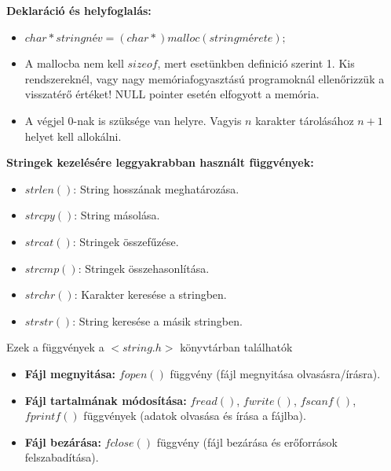 \documentclass[11pt,a4paper]{article}
\begin{document}
            \begin{tcolorbox}[colback=blue!5!white,colframe=blue!50!black,title= 62. Ismertesse a string tárolás C nyelvű megvalósítást{,} valamint a stringek kezelésére leggyakrabban használt függvényeket!]
            \textbf{Deklaráció és helyfoglalás:}    
                \begin{itemize}
                    \item \(char*stringnév = (char*)malloc(string mérete);\)
                    \item A mallocba nem kell \(sizeof\), mert esetünkben definició szerint 1. Kis rendszereknél, vagy nagy memóriafogyasztású programoknál ellenőrizzük a visszatérő értéket! NULL pointer esetén elfogyott a memória.
                    \item A végjel 0-nak is szüksége van helyre. Vagyis \(n\) karakter tárolásához \(n+1\) helyet kell allokálni.
                \end{itemize}
            \textbf{Stringek kezelésére leggyakrabban használt függvények:}
            \begin{itemize}
                \item \(strlen()\): String hosszának meghatározása.
                \item \(strcpy()\): String másolása.
                \item \(strcat()\): Stringek összefűzése.
                \item \(strcmp()\): Stringek összehasonlítása.
                \item \(strchr()\): Karakter keresése a stringben.
                \item \(strstr()\): String keresése a másik stringben.
            \end{itemize}
            Ezek a függvények a \(<string.h>\) könyvtárban találhatók
            \end{tcolorbox}
            
            \begin{tcolorbox}[colback=blue!5!white,colframe=blue!50!black,title= 63. Ismertesse a szöveges fájlok módosításának lépéseit!]
                \begin{itemize}
                    \item \textbf{Fájl megnyitása:} \(fopen()\) függvény (fájl megnyitása olvasásra/írásra).
                    \item \textbf{Fájl tartalmának módosítása:} \(fread()\), \(fwrite()\), \(fscanf()\), \(fprintf()\) függvények (adatok olvasása és írása a fájlba).
                    \item \textbf{Fájl bezárása:} \(fclose()\) függvény (fájl bezárása és erőforrások felszabadítása).
                \end{itemize}
            \end{tcolorbox}

        
\end{document}
